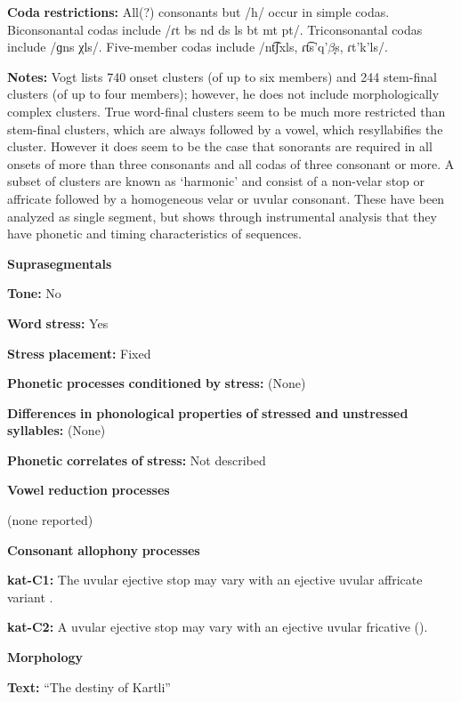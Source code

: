 \textbf{Coda} \textbf{restrictions:} All(?) consonants but /h/ occur in simple codas. Biconsonantal codas include /ɾt bs nd ds ls bt mt pt/. Triconsonantal codas include /ɡns χls/. Five-member codas include /nt͡ʃxls, ɾt͡s’q’$\beta ̞$s, ɾt'k'ls/.

\textbf{Notes:} Vogt lists 740 onset clusters (of up to six members) and 244 stem-final clusters (of up to four members); however, he does not include morphologically complex clusters. True word-final clusters seem to be much more restricted than stem-final clusters, which are always followed by a vowel, which resyllabifies the cluster. However it does seem to be the case that sonorants are required in all onsets of more than three consonants and all codas of three consonant or more. A subset of clusters are known as ‘harmonic’ and consist of a non-velar stop or affricate followed by a homogeneous velar or uvular consonant. These have been analyzed as single segment, but \citet{Chitoran1998} shows through instrumental analysis that they have phonetic and timing characteristics of sequences.

\textbf{Suprasegmentals}

\textbf{Tone:} No

\textbf{Word} \textbf{stress:} Yes

\textbf{Stress} \textbf{placement:} Fixed

\textbf{Phonetic} \textbf{processes} \textbf{conditioned} \textbf{by} \textbf{stress:} (None)

\textbf{Differences} \textbf{in} \textbf{phonological} \textbf{properties} \textbf{of} \textbf{stressed} \textbf{and} \textbf{unstressed} \textbf{syllables:} (None)

\textbf{Phonetic} \textbf{correlates} \textbf{of} \textbf{stress:} Not described

\textbf{Vowel} \textbf{reduction} \textbf{processes}

(none reported)

\textbf{Consonant} \textbf{allophony} \textbf{processes}

\textbf{kat-C1:} The uvular ejective stop may vary with an ejective uvular affricate variant \citep{Aronson1991}.

\textbf{kat-C2:} A uvular ejective stop may vary with an ejective uvular fricative (\citealt{ShostedChikovani2006}).

\textbf{Morphology}

\textbf{Text:} “The destiny of Kartli” \citep[655-663]{Hewitt1995}

